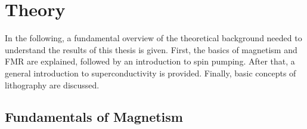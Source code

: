 \newcommand{\RNum}[1]{\uppercase\expandafter{\romannumeral #1\relax}}

\chapter{Theory}\label{ch:theory}
In the following, a fundamental overview of the theoretical background needed to understand the results of this thesis is given. First, the basics of magnetism and FMR are explained, followed by an introduction to spin pumping. After that, a general introduction to superconductivity is provided. Finally, basic concepts of lithography are discussed.

\section{Fundamentals of Magnetism}

